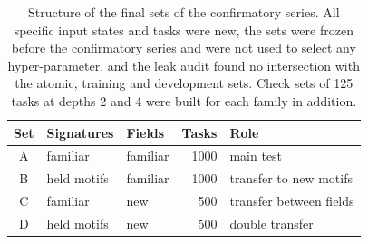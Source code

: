 \begin{table}[!tbh]
\centering\footnotesize\setlength{\tabcolsep}{5pt}
\begin{tabular}{|c|l|l|r|l|}
\hline
\textbf{Set} & \textbf{Signatures} & \textbf{Fields} & \textbf{Tasks} & \textbf{Role} \\
\hline
A & familiar & familiar & 1000 & main test \\ \hline
B & held motifs & familiar & 1000 & transfer to new motifs \\ \hline
C & familiar & new & 500 & transfer between fields \\ \hline
D & held motifs & new & 500 & double transfer \\ \hline
\end{tabular}
\caption{Structure of the final sets of the confirmatory series. All specific input
states and tasks were new, the sets were frozen before the confirmatory series and
were not used to select any hyper-parameter, and the leak audit found no
intersection with the atomic, training and development sets. Check sets of 125
tasks at depths 2 and 4 were built for each family in addition.}
\label{tab:sets}
\end{table}
